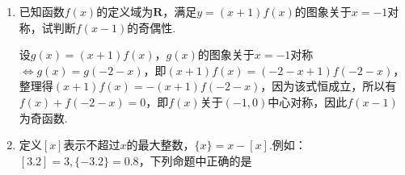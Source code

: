 \begin{enumerate}
    \item 已知函数$f(x)$的定义域为$\mathbf{R}$，满足$y = (x+1)f(x)$的图象关于$x = -1$对称，试判断$f(x-1)$的奇偶性.
    \begin{jieda}
        设$g(x) = (x+1)f(x)$，$g(x)$的图象关于$x = -1$对称$\Longleftrightarrow g(x) = g(-2-x)$，即$(x+1)f(x) = (-2-x+1)f(-2-x)$，整理得$(x+1)f(x) = -(x+1)f(-2-x)$，因为该式恒成立，所以有$f(x) + f(-2-x) = 0$，即$f(x)$关于$(-1, 0)$中心对称，因此$f(x-1)$为奇函数.
    \end{jieda}
    \item 定义$[x]$表示不超过$x$的最大整数，$\{x\} = x - [x]$.例如：$[3.2] = 3, \{-3.2\} = 0.8$，下列命题中正确的是
    \begin{jieda}
    \end{jieda}
   

\end{enumerate}
